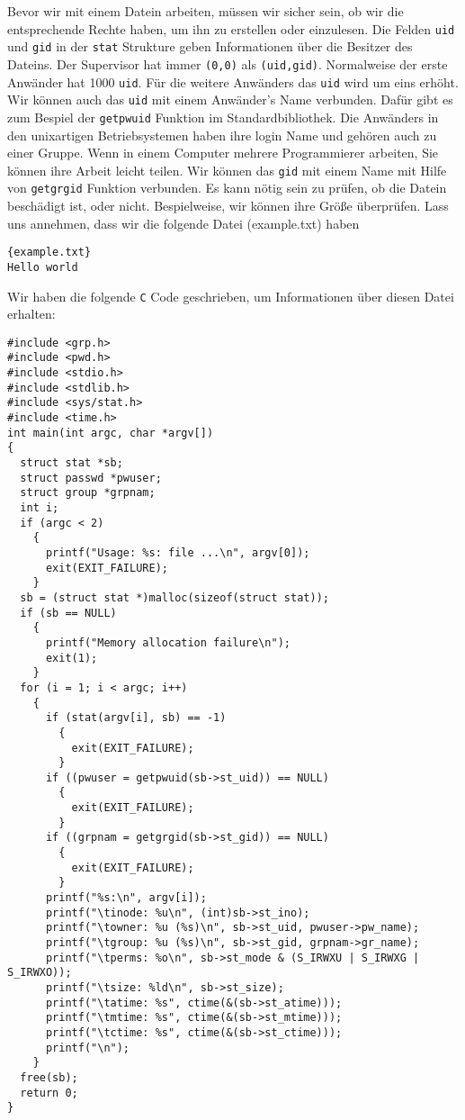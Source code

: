 Bevor wir mit einem Datein arbeiten, müssen wir sicher sein, ob wir die entsprechende Rechte haben, um ihn zu 
erstellen oder einzulesen. Die Felden \texttt{uid} und \texttt{gid} in der \texttt{stat} Strukture geben Informationen 
über die Besitzer des Dateins. Der Supervisor hat immer \texttt{(0,0)} als \texttt{(uid,gid)}. Normalweise der erste Anwänder 
hat 1000 \texttt{uid}. Für die weitere Anwänders das \texttt{uid} wird um eins erhöht. 
Wir können auch das \texttt{uid} mit einem Anwänder's Name verbunden. Dafür gibt es zum Bespiel der \texttt{getpwuid} 
Funktion im Standardbibliothek. Die Anwänders in den unixartigen Betriebsystemen haben ihre login Name und gehören
auch zu einer Gruppe. Wenn in einem Computer mehrere Programmierer arbeiten, Sie können ihre Arbeit leicht teilen. 
Wir können das \texttt{gid} mit einem Name mit Hilfe von \texttt{getgrgid} Funktion verbunden.
Es kann nötig sein zu prüfen, ob die Datein beschädigt ist, oder nicht.  Bespielweise, wir können ihre Größe
überprüfen. Lass uns annehmen, dass wir die folgende Datei (example.txt) haben
\begin{lstlisting}{example.txt}
Hello world
\end{lstlisting}
Wir haben die folgende \texttt{C} Code geschrieben, um Informationen über diesen Datei erhalten:
\begin{lstlisting}
#include <grp.h>
#include <pwd.h>
#include <stdio.h>
#include <stdlib.h>
#include <sys/stat.h>
#include <time.h>
int main(int argc, char *argv[])
{
  struct stat *sb;
  struct passwd *pwuser;
  struct group *grpnam;
  int i;
  if (argc < 2)
    {
      printf("Usage: %s: file ...\n", argv[0]);
      exit(EXIT_FAILURE);
    }
  sb = (struct stat *)malloc(sizeof(struct stat));
  if (sb == NULL)
    {
      printf("Memory allocation failure\n");
      exit(1);
    }
  for (i = 1; i < argc; i++)
    {
      if (stat(argv[i], sb) == -1)
        {
          exit(EXIT_FAILURE);
        }
      if ((pwuser = getpwuid(sb->st_uid)) == NULL)
        {
          exit(EXIT_FAILURE);
        }
      if ((grpnam = getgrgid(sb->st_gid)) == NULL)
        {
          exit(EXIT_FAILURE);
        }
      printf("%s:\n", argv[i]);
      printf("\tinode: %u\n", (int)sb->st_ino);
      printf("\towner: %u (%s)\n", sb->st_uid, pwuser->pw_name);
      printf("\tgroup: %u (%s)\n", sb->st_gid, grpnam->gr_name);
      printf("\tperms: %o\n", sb->st_mode & (S_IRWXU | S_IRWXG | S_IRWXO));
      printf("\tsize: %ld\n", sb->st_size);
      printf("\tatime: %s", ctime(&(sb->st_atime)));
      printf("\tmtime: %s", ctime(&(sb->st_mtime)));
      printf("\tctime: %s", ctime(&(sb->st_ctime)));
      printf("\n");
    }
  free(sb);
  return 0;
}
\end{lstlisting}
